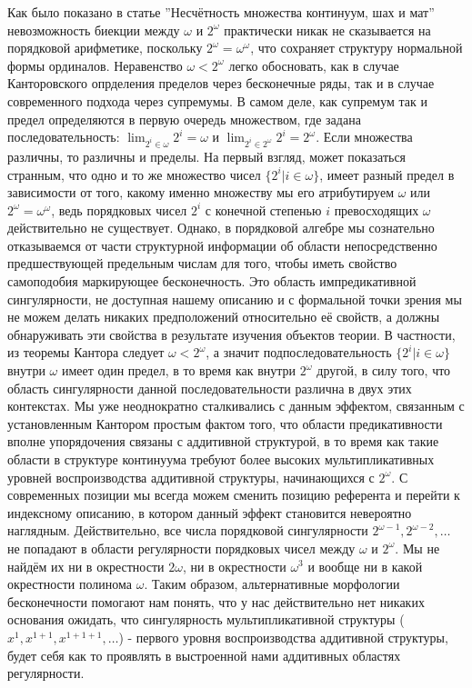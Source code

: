 \documentclass[12pt]{article}
\begin{document}
Как было показано в статье ''Несчётность множества континуум, шах и мат'' невозможность биекции между $\omega$ и $2^{\omega}$ практически никак не сказывается на порядковой арифметике, поскольку $2^{\omega} = \omega^{\omega}$, что сохраняет структуру нормальной формы ординалов. Неравенство $\omega < 2^{\omega}$ легко обосновать, как в случае Канторовского опрделения пределов через бесконечные ряды, так и в случае современного подхода через супремумы. В самом деле, как супремум так и предел определяются в первую очередь множеством, где задана последовательность: $\lim_{2^i \in \omega} 2^i = \omega$ и $\lim_{2^i \in 2^{\omega}} 2^i = 2^{\omega}$. Если множества различны, то различны и пределы. На первый взгляд, может показаться странным, что одно и то же множество чисел $\{2^i | i \in \omega \}$, имеет разный предел в зависимости от того, какому именно множеству мы его атрибутируем $\omega$ или $2^{\omega} = \omega^{\omega}$, ведь порядковых чисел $2^i$ с конечной степенью $i$ превосходящих $\omega$ действительно не существует. Однако, в порядковой алгебре мы сознательно отказываемся от части структурной информации об области непосредственно предшествующей предельным числам для того, чтобы иметь свойство самоподобия маркирующее бесконечность. Это область импредикативной сингулярности, не доступная нашему описанию и с формальной точки зрения мы не можем делать никаких предположений относительно её свойств, а должны обнаруживать эти свойства в результате изучения объектов теории. В частности, из теоремы Кантора следует $\omega < 2^{\omega}$, а значит подпоследовательность $\{2^i | i \in \omega \}$ внутри $\omega$ имеет один предел, в то время как внутри $2^{\omega}$ другой, в силу того, что область сингулярности данной последовательности различна в двух этих контекстах. Мы уже неоднократно сталкивались с данным эффектом, связанным с установленным Кантором простым фактом того, что области предикативности вполне упорядочения связаны с аддитивной структурой, в то время как такие области в структуре континуума требуют более высоких мультипликативных уровней воспроизводства аддитивной структуры, начинающихся с $2^{\omega}$. С современных позиции мы всегда можем сменить позицию референта и перейти к индексному описанию, в котором данный эффект становится невероятно наглядным. Действительно, все числа порядковой сингулярности $2^{\omega - 1}, 2^{\omega - 2}, \dots$ не попадают в области регулярности порядковых чисел между $\omega$ и $2^{\omega}$. Мы не найдём их ни в окрестности $2\omega$, ни в окрестности $\omega^3$ и вообще ни в какой окрестности полинома $\omega$. Таким образом, альтернативные морфологии бесконечности помогают нам понять, что у нас действительно нет никаких основания ожидать, что сингулярность мультипликативной структуры ($x^1, x^{1 + 1}, x^{1 + 1 + 1}, \dots$) - первого уровня воспроизводства аддитивной структуры, будет себя как то проявлять в выстроенной нами аддитивных областях регулярности.
\end{document}
